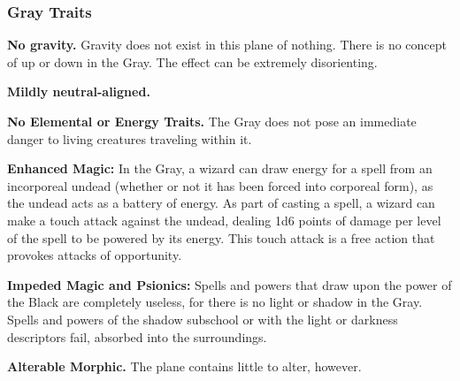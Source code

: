 \subsubsection{Gray Traits}
\begin{itemize*}
\item \textbf{No gravity.} Gravity does not exist in this plane of nothing. There is no concept of up or down in the Gray. The effect can be extremely disorienting.
\item \textbf{Mildly neutral-aligned.}
\item \textbf{No Elemental or Energy Traits.} The Gray does not pose an immediate danger to living creatures traveling within it.
\item \textbf{Enhanced Magic:} In the Gray, a wizard can draw energy for a spell from an incorporeal undead (whether or not it has been forced into corporeal form), as the undead acts as a battery of energy. As part of casting a spell, a wizard can make a touch attack against the undead, dealing 1d6 points of damage per level of the spell to be powered by its energy. This touch attack is a free action that provokes attacks of opportunity.
\item \textbf{Impeded Magic and Psionics:} Spells and powers that draw upon the power of the Black are completely useless, for there is no light or shadow in the Gray. Spells and powers of the shadow subschool or with the light or darkness descriptors fail, absorbed into the surroundings.
\item \textbf{Alterable Morphic.} The plane contains little to alter, however.
\end{itemize*}




